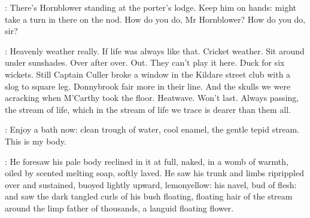 \BloomInt:
There's Hornblower standing at the porter's lodge.
Keep him on hands:
might take a turn in there on the nod.
How do you do, Mr Hornblower?
How do you do, sir?

\BloomInt:
Heavenly weather really.
If life was always like that.
Cricket weather.
Sit around under sunshades.
Over after over.
Out.
They can't play it here.
Duck for six wickets.
Still Captain Culler broke a window in the Kildare street club
with a slog to square leg.
Donnybrook fair more in their line.
And the skulls we were acracking when M'Carthy took the floor.
Heatwave.
Won't last.
Always passing,
the stream of life,
which in the stream of life we trace
is dearer than them all.

\BloomInt:
Enjoy a bath now:
clean trough of water,
cool enamel,
the gentle tepid stream.
This is my body.

:
He foresaw his pale body reclined in it at full,
naked,
in a womb of warmth,
oiled by scented melting soap,
softly laved.
He saw his trunk and limbs riprippled over
and sustained,
buoyed lightly upward,
lemonyellow:
his navel, bud of flesh:
and saw the dark tangled curls of his bush
floating,
floating hair of the stream
around the limp father of thousands,
a languid floating flower.
